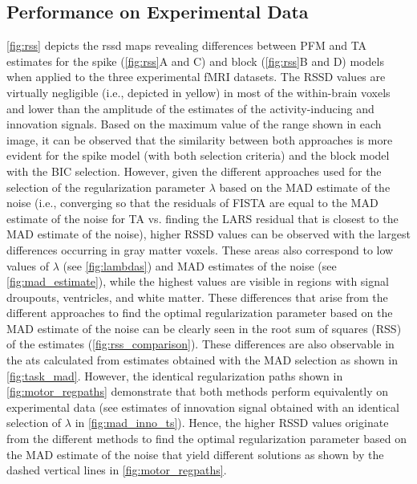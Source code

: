 \subsection{Performance on Experimental Data}

\cref{fig:rss} depicts the \acrshort*{rssd} maps revealing differences between
PFM and TA estimates for the spike (\cref{fig:rss}A and C) and block
(\cref{fig:rss}B and D) models when applied to the three experimental fMRI
datasets. The RSSD values are virtually negligible (i.e., depicted in yellow) in
most of the within-brain voxels and lower than the amplitude of the estimates of
the activity-inducing and innovation signals. Based on the maximum value of the
range shown in each image, it can be observed that the similarity between both
approaches is more evident for the spike model (with both selection criteria)
and the block model with the BIC selection. However, given the different
approaches used for the selection of the regularization parameter $\lambda$
based on the MAD estimate of the noise (i.e., converging so that the residuals
of FISTA are equal to the MAD estimate of the noise for TA vs. finding the LARS
residual that is closest to the MAD estimate of the noise), higher RSSD values
can be observed with the largest differences occurring in gray matter voxels.
These areas also correspond to low values of $\lambda$ (see \cref{fig:lambdas})
and MAD estimates of the noise (see \cref{fig:mad_estimate}), while the highest
values are visible in regions with signal droupouts, ventricles, and white
matter. These differences that arise from the different approaches to find the
optimal regularization parameter based on the MAD estimate of the noise can be
clearly seen in the root sum of squares (RSS) of the estimates
(\cref{fig:rss_comparison}). These differences are also observable in the
\acrshort*{ats} calculated from estimates obtained with the MAD selection as
shown in \cref{fig:task_mad}. However, the identical regularization paths shown
in \cref{fig:motor_regpaths} demonstrate that both methods perform equivalently
on experimental data (see estimates of innovation signal obtained with an
identical selection of $\lambda$ in \cref{fig:mad_inno_ts}). Hence, the higher
RSSD values originate from the different methods to find the optimal
regularization parameter based on the MAD estimate of the noise that yield
different solutions as shown by the dashed vertical lines in
\cref{fig:motor_regpaths}.

